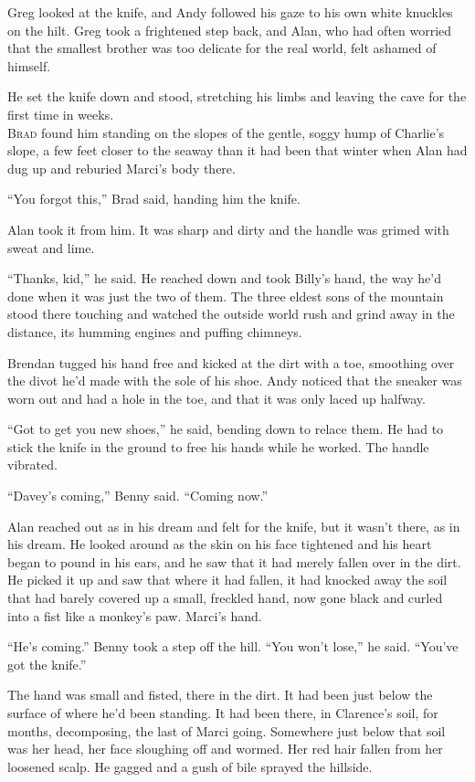 \documentclass{article}
\begin{document}
Greg looked at the knife, and Andy followed his gaze to his own white
knuckles on the hilt.  Greg took a frightened step back, and Alan, who
had often worried that the smallest brother was too delicate for the
real world, felt ashamed of himself.

He set the knife down and stood, stretching his limbs and leaving the
cave for the first time in weeks.
\\
\lettrine[lines=3, lhang=.5, nindent=0pt, findent=2pt]{B}{rad} found him standing on the slopes of the gentle, soggy hump of
Charlie's slope, a few feet closer to the seaway than it had been that
winter when Alan had dug up and reburied Marci's body there.

``You forgot this,'' Brad said, handing him the knife.

Alan took it from him.  It was sharp and dirty and the handle was
grimed with sweat and lime.

``Thanks, kid,'' he said.  He reached down and took Billy's hand, the
way he'd done when it was just the two of them.  The three eldest sons
of the mountain stood there touching and watched the outside world
rush and grind away in the distance, its humming engines and puffing
chimneys.

Brendan tugged his hand free and kicked at the dirt with a toe,
smoothing over the divot he'd made with the sole of his shoe.  Andy
noticed that the sneaker was worn out and had a hole in the toe, and
that it was only laced up halfway.

``Got to get you new shoes,'' he said, bending down to relace them. 
He had to stick the knife in the ground to free his hands while he
worked.  The handle vibrated.

``Davey's coming,'' Benny said.  ``Coming now.''

Alan reached out as in his dream and felt for the knife, but it wasn't
there, as in his dream.  He looked around as the skin on his face
tightened and his heart began to pound in his ears, and he saw that it
had merely fallen over in the dirt.  He picked it up and saw that
where it had fallen, it had knocked away the soil that had barely
covered up a small, freckled hand, now gone black and curled into a
fist like a monkey's paw.  Marci's hand.

``He's coming.'' Benny took a step off the hill.  ``You won't lose,''
he said.  ``You've got the knife.''

The hand was small and fisted, there in the dirt.  It had been just
below the surface of where he'd been standing.  It had been there, in
Clarence's soil, for months, decomposing, the last of Marci going. 
Somewhere just below that soil was her head, her face sloughing off
and wormed.  Her red hair fallen from her loosened scalp.  He gagged
and a gush of bile sprayed the hillside.
\end{document}
